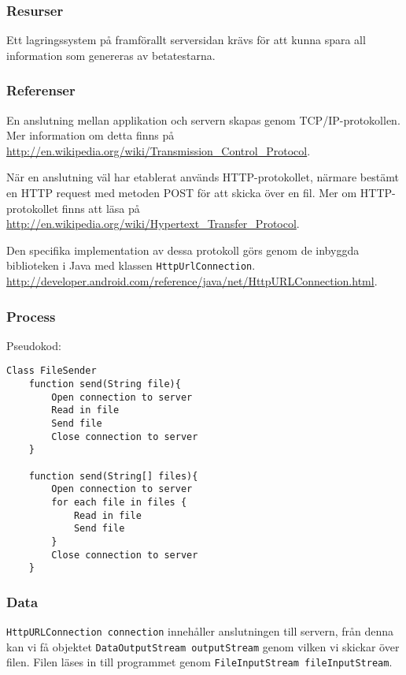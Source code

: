 \subsubsection{Resurser}
Ett lagringssystem på framförallt serversidan krävs för att kunna spara all information som genereras av betatestarna. 

\subsubsection{Referenser}
En anslutning mellan applikation och servern skapas genom TCP/IP-protokollen. Mer information om detta finns på \url{http://en.wikipedia.org/wiki/Transmission_Control_Protocol}.

När en anslutning väl har etablerat används HTTP-protokollet, närmare bestämt en HTTP request med metoden POST för att skicka över en fil. Mer om HTTP-protokollet finns att läsa på \url{http://en.wikipedia.org/wiki/Hypertext_Transfer_Protocol}. 

Den specifika implementation av dessa protokoll görs genom de inbyggda biblioteken i Java med klassen \verb:HttpUrlConnection:. \url{http://developer.android.com/reference/java/net/HttpURLConnection.html}. 

\subsubsection{Process}
Pseudokod: 
\begin{verbatim}
Class FileSender
	function send(String file){
		Open connection to server
		Read in file
		Send file
		Close connection to server
	}
	
	function send(String[] files){
		Open connection to server
		for each file in files {
			Read in file
			Send file		
		}
		Close connection to server
	}
\end{verbatim}

\subsubsection{Data}
\verb:HttpURLConnection connection: innehåller anslutningen till servern, från denna kan vi få objektet \verb:DataOutputStream outputStream: genom vilken vi skickar över filen. Filen läses in till programmet genom \verb:FileInputStream fileInputStream:. 